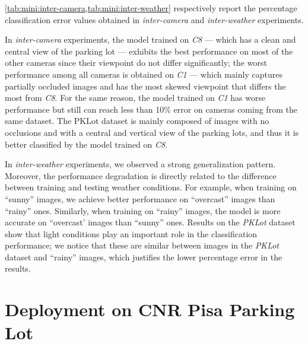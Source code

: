 \ref{tab:mini:inter-camera,tab:mini:inter-weather} respectively report the percentage classification error values obtained in \emph{inter-camera} and \emph{inter-weather} experiments.

In \emph{inter-camera} experiments, the model trained on \emph{C8} --- which has a clean and central view of the parking lot --- exhibits the best performance on most of the other cameras since their viewpoint do not differ significantly;
the worst performance among all cameras is obtained on \emph{C1} --- which mainly captures partially occluded images and has the most skewed viewpoint that differs the most from \emph{C8}.
For the same reason, the model trained on \emph{C1} has worse performance but still can reach less than 10\% error on cameras coming from the same dataset.
The PKLot dataset is mainly composed of images with no occlusions and with a central and vertical view of the parking lots, and thus it is better classified by the model trained on \emph{C8}.

In \emph{inter-weather} experiments, we observed a strong generalization pattern.
Moreover, the performance degradation is directly related to the difference between training and testing weather conditions.
For example, when training on ``sunny'' images, we achieve better performance on ``overcast'' images than ``rainy'' ones.
Similarly, when training on ``rainy'' images, the model is more accurate on ``overcast' images than ``sunny'' ones.
Results on the \emph{PKLot} dataset show that light conditions play an important role in the classification performance;
we notice that these are similar between images in the \emph{PKLot} dataset and ``rainy'' images, which justifies the lower percentage error in the results.

\section{Deployment on CNR Pisa Parking Lot}
\label{sec:mini:deployment}

